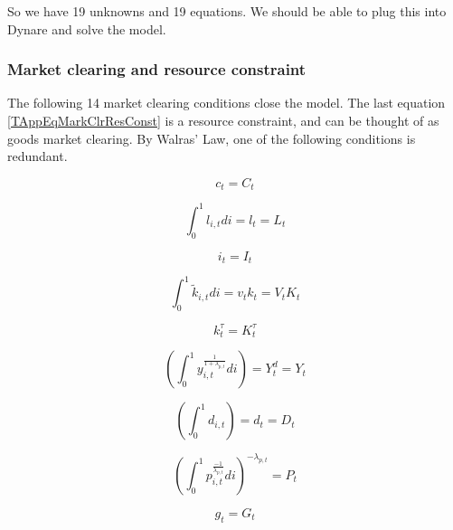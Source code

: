 \documentclass[article,11pt,letterpaper,fleqn]{article}
\theoremstyle{definition}
\numberwithin{equation}{section}
\begin{document}
{So we have 19 unknowns and 19 equations.  We should be able to plug this into Dynare and solve the model.

\subsubsection{Market clearing and resource constraint}
\label{TAppSecMCandRC}

The following 14 market clearing conditions close the model. The last equation \eqref{TAppEqMarkClrResConst} is a resource constraint, and can be thought of as goods market clearing. By Walras' Law, one of the following conditions is redundant.

\begin{equation}\label{TAppEqMarkClrC}
   c_t = C_t
\end{equation}

\begin{equation}\label{TAppEqMarkClrL}
   \int_{0}^{1}l_{i,t}di = l_t = L_t
\end{equation}

\begin{equation}\label{TAppEqMarkClrI}
   i_t = I_t
\end{equation}

\begin{equation}\label{TAppEqMarkClrK}
   \int_{0}^{1}\tilde{k}_{i,t}di = v_{t}k_{t} = V_{t}K_{t}
\end{equation}

\begin{equation}\label{TAppEqMarkClrKtau}
   k_t^\tau = K_t^\tau
\end{equation}

\begin{equation}\label{TAppEqMarkClry}
   \left(\int_{0}^{1}y_{i,t}^{\frac{1}{1+\lambda_{p,t}}} di \right) = Y_{t}^{d} = Y_{t}
\end{equation}

\begin{equation}\label{TAppEqMarkClrD}
   \left(\int_{0}^{1}d_{i,t}\right) = d_t = D_t
\end{equation}

\begin{equation}\label{TAppEqMarkClrpit}
   \left(\int_{0}^{1}p_{i,t}^{\frac{-1}{\lambda_{p,t}}}di\right)^{-\lambda_{p,t}} = P_t
\end{equation}

\begin{equation}\label{TAppEqMarkClrG}
   g_t = G_t
\end{equation}

}
\end{document}
